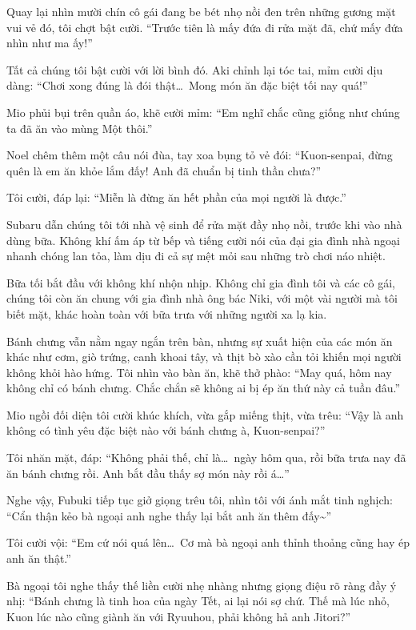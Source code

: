 \documentclass[../main.tex]{subfiles}
\begin{document}
Quay lại nhìn mười chín cô gái đang be bét nhọ nồi đen trên những gương mặt vui vẻ đó, tôi chợt bật cười. ``Trước tiên là mấy đứa đi rửa mặt đã, chứ mấy đứa nhìn như ma ấy!''

Tất cả chúng tôi bật cười với lời bình đó. Aki chỉnh lại tóc tai, mỉm cười dịu dàng: ``Chơi xong đúng là đói thật\dots\ Mong món ăn đặc biệt tối nay quá!''

Mio phủi bụi trên quần áo, khẽ cười mỉm: ``Em nghĩ chắc cũng giống như chúng ta đã ăn vào mùng Một thôi.''

Noel chêm thêm một câu nói đùa, tay xoa bụng tỏ vẻ đói: ``Kuon-senpai, đừng quên là em ăn khỏe lắm đấy! Anh đã chuẩn bị tinh thần chưa?''

Tôi cười, đáp lại: ``Miễn là đừng ăn hết phần của mọi người là được.''

Subaru dẫn chúng tôi tới nhà vệ sinh để rửa mặt đầy nhọ nồi, trước khi vào nhà dùng bữa. Không khí ấm áp từ bếp và tiếng cười nói của đại gia đình nhà ngoại nhanh chóng lan tỏa, làm dịu đi cả sự mệt mỏi sau những trò chơi náo nhiệt.

\ct

Bữa tối bắt đầu với không khí nhộn nhịp. Không chỉ gia đình tôi và các cô gái, chúng tôi còn ăn chung với gia đình nhà ông bác Niki, với một vài người mà tôi biết mặt, khác hoàn toàn với bữa trưa với những người xa lạ kia.

Bánh chưng vẫn nằm ngay ngắn trên bàn, nhưng sự xuất hiện của các món ăn khác như cơm, giò trứng, canh khoai tây, và thịt bò xào cần tỏi khiến mọi người không khỏi hào hứng. Tôi nhìn vào bàn ăn, khẽ thở phào: ``May quá, hôm nay không chỉ có bánh chưng. Chắc chắn sẽ không ai bị ép ăn thứ này cả tuần đâu.''

Mio ngồi đối diện tôi cười khúc khích, vừa gắp miếng thịt, vừa trêu: ``Vậy là anh không có tình yêu đặc biệt nào với bánh chưng à, Kuon-senpai?''

Tôi nhăn mặt, đáp: ``Không phải thế, chỉ là\dots\ ngày hôm qua, rồi bữa trưa nay đã ăn bánh chưng rồi. Anh bắt đầu thấy sợ món này rồi á\dots''

Nghe vậy, Fubuki tiếp tục giở giọng trêu tôi, nhìn tôi với ánh mắt tinh nghịch: ``Cẩn thận kẻo bà ngoại anh nghe thấy lại bắt anh ăn thêm đấy\~{}''

Tôi cười vội: ``Em cứ nói quá lên\dots\ Cơ mà bà ngoại anh thỉnh thoảng cũng hay ép anh ăn thật.''

Bà ngoại tôi nghe thấy thế liền cười nhẹ nhàng nhưng giọng điệu rõ ràng đầy ý nhị: ``Bánh chưng là tinh hoa của ngày Tết, ai lại nói sợ chứ. Thế mà lúc nhỏ, Kuon lúc nào cũng giành ăn với Ryuuhou, phải không hả anh Jitori?''
\end{document}
